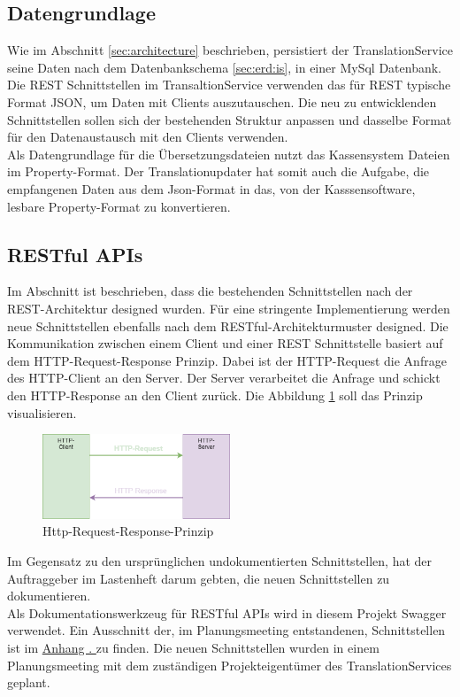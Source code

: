 \documentclass[10pt, oneside, ngerman]{article}
\newcommand{\attsecref}[1]{\hyperref[{#1}]{Anhang \thesubsection. \nameref*{#1}}}
\begin{document}
    \subsection{Datengrundlage}
      Wie im Abschnitt \ref{sec:architecture} beschrieben, persistiert der TranslationService seine Daten nach dem Datenbankschema \ref{sec:erd:is}, in einer MySql Datenbank.
      Die REST Schnittstellen im TransaltionService verwenden das für REST typische Format JSON, um Daten mit Clients auszutauschen. Die neu zu entwicklenden Schnittstellen 
      sollen sich der bestehenden Struktur anpassen und dasselbe Format für den Datenaustausch mit den Clients verwenden.\\
      Als Datengrundlage für die Übersetzungsdateien nutzt das Kassensystem Dateien im Property-Format. Der Translationupdater hat somit auch die Aufgabe, die empfangenen
      Daten aus dem Json-Format in das, von der Kasssensoftware, lesbare Property-Format zu konvertieren.
  \subsection{RESTful APIs}
      Im Abschnitt  ist beschrieben, dass die bestehenden Schnittstellen nach der REST-Architektur designed wurden. Für eine stringente Implementierung 
      werden neue Schnittstellen ebenfalls nach dem RESTful-Architekturmuster designed. Die Kommunikation zwischen einem Client und einer REST Schnittstelle basiert auf dem HTTP-Request-Response Prinzip.
      Dabei ist der HTTP-Request die Anfrage des HTTP-Client an den Server. Der Server verarbeitet die Anfrage und schickt den HTTP-Response an den Client zurück. 
      Die Abbildung \ref{abb:api:rtr} soll das Prinzip visualisieren.
      \begin{figure}[ht]
        \centering
          \includegraphics[width=0.5\textwidth]{http-request-response.png}
        \caption{Http-Request-Response-Prinzip}
        \label{abb:api:rtr}
      \end{figure}
      Im Gegensatz zu den ursprünglichen undokumentierten Schnittstellen, hat der Auftraggeber im Lastenheft darum gebten, die neuen Schnittstellen zu dokumentieren.\\
      Als Dokumentationswerkzeug für RESTful APIs wird in diesem Projekt Swagger verwendet. Ein Ausschnitt der, im Planungsmeeting entstandenen, Schnittstellen ist im \attsecref{sec:swa:ts} zu finden.
      Die neuen Schnittstellen wurden in einem Planungsmeeting mit dem zuständigen Projekteigentümer des TranslationServices geplant.
\end{document}
